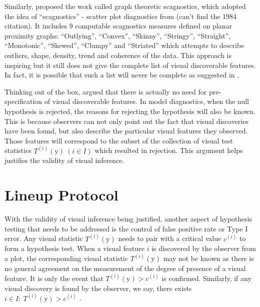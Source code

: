 \documentclass{monashthesis}
\begin{document}
Similarly, \textcite{wilkinson_graph-theoretic_2005} proposed the work called graph theoretic scagnostics, which adopted the idea of ``scagnostics'' - scatter plot diagnostics from (can't find the 1984 citation). It includes 9 computable scagnostics measures defined on planar proximity graphs: ``Outlying'', ``Convex'', ``Skinny'', ``Stringy'', ``Straight'', ``Monotonic'', ``Skewed'', ``Clumpy'' and ``Striated'' which attempts to describe outliers, shape, density, trend and coherence of the data. This approach is inspiring but it still does not give the complete list of visual discoverable features. In fact, it is possible that such a list will never be complete as suggested in \textcite{buja_statistical_2009}.

Thinking out of the box, \textcite{buja_statistical_2009} argued that there is actually no need for pre-specification of visual discoverable features. In model diagnostics, when the null hypothesis is rejected, the reasons for rejecting the hypothesis will also be known. This is because observers can not only point out the fact that visual discoveries have been found, but also describe the particular visual features they observed. Those features will correspond to the subset of the collection of visual test statistics \(T^{(i)}(\boldsymbol{\mathrm{y}})~(i \in I)\) which resulted in rejection. This argument helps justifies the validity of visual inference.

\hypertarget{lineup-protocol}{%
\section{Lineup Protocol}\label{lineup-protocol}}

With the validity of visual inference being justified, another aspect of hypothesis testing that needs to be addressed is the control of false positive rate or Type I error. Any visual statistic \(T^{(i)}(\boldsymbol{\mathrm{y}})\) needs to pair with a critical value \(c^{(i)}\) to form a hypothesis test. When a visual feature \(i\) is discovered by the observer from a plot, the corresponding visual statistic \(T^{(i)}(\boldsymbol{\mathrm{y}})\) may not be known as there is no general agreement on the measurement of the degree of presence of a visual feature. It is only the event that \(T^{(i)}(\boldsymbol{\mathrm{y}}) > c^{(i)}\) is confirmed. Similarly, if any visual discovery is found by the observer, we say, there exists \(i \in I:~T^{(i)}(\boldsymbol{\mathrm{y}}) > c^{(i)}\) \autocite{buja_statistical_2009}.
\end{document}
